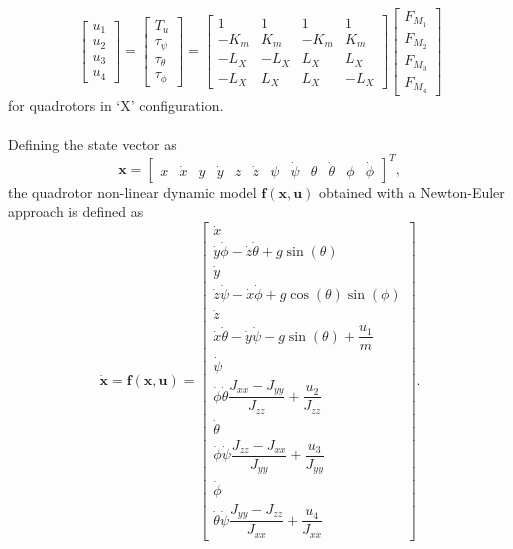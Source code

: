 \begin{equation}
\begin{bmatrix}
u_1 \\[5pt] u_2 \\[5pt] u_3 \\[5pt] u_4
\end{bmatrix}	 = \begin{bmatrix}
	T_u\\[5pt]
	\tau_{\psi}\\[5pt]
	\tau_{\theta}\\[5pt]
	\tau_{\phi}
	\end{bmatrix} = \begin{bmatrix}
	1 & 1 & 1 & 1 \\[5pt]
	-K_{m} & K_{m} & -K_{m} & K_{m}\\[5pt]
	-L_{X} & -L_{X} & L_{X} & L_{X}\\[5pt]
	-L_{X} & L_{X} & L_{X} & -L_{X}
							\end{bmatrix}
\begin{bmatrix}
F_{M_1}\\[5pt]
F_{M_2}\\[5pt]
F_{M_3}\\[5pt]
F_{M_4}
\end{bmatrix}
\end{equation}
for quadrotors in `X' configuration.
\\\\
Defining the state vector as
\setcounter{MaxMatrixCols}{20}
\begin{equation}
\mathbf{x} = \begin{bmatrix}
x & \dot{x} & y & \dot{y} & z & \dot{z} & \psi & \dot{\psi} & \theta & \dot{\theta} & \phi & \dot{\phi}
\end{bmatrix}^{T},
\end{equation} 
the quadrotor non-linear dynamic model $\mathbf{f(x,u)}$ obtained with a Newton-Euler approach is defined as
\begin{equation}
\label{eqn:newtoneulermodel}
\mathbf{\dot{x}} = \mathbf{f(x,u)} = \begin{bmatrix}
\dot{x} \\[5pt]
\dot{y} \dot{\phi} - \dot{z} \dot{\theta} + g \sin(\theta) \\[5pt]
\dot{y} \\[5pt]
\dot{z} \dot{\psi} - \dot{x} \dot{\phi} + g \cos(\theta)\sin(\phi) \\[5pt]
\dot{z} \\[5pt]
\dot{x} \dot{\theta} - \dot{y} \dot{\psi} - g \sin(\theta) + \dfrac{u_{1}}{m} \\[5pt]
\dot{\psi} \\[5pt]
\dot{\phi}\dot{\theta} \dfrac{J_{xx}-J_{yy}}{J_{zz}} + \dfrac{u_{2}}{J_{zz}} \\[5pt]
\dot{\theta} \\[5pt]
\dot{\phi} \dot{\psi}\dfrac{J_{zz}-J_{xx}}{J_{yy}} + \dfrac{u_{3}}{J_{yy}} \\[5pt]
\dot{\phi} \\[5pt]
\dot{\theta}\dot{\psi}\dfrac{J_{yy}-J_{zz}}{J_{xx}} + \dfrac{u_{4}}{J_{xx}}
\end{bmatrix}.
\end{equation}

